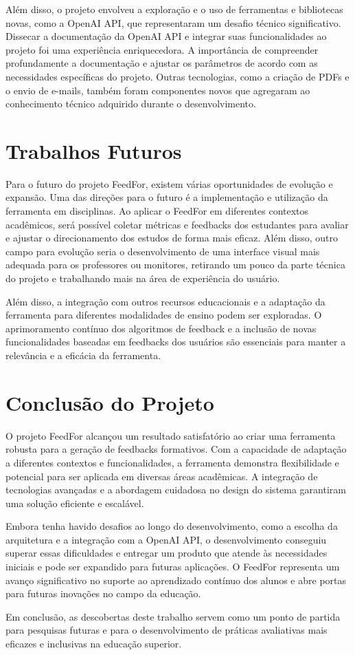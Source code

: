 Além disso, o projeto envolveu a exploração e o uso de ferramentas e bibliotecas novas, como a OpenAI API, que representaram um desafio técnico significativo. Dissecar a documentação da OpenAI API e integrar suas funcionalidades ao projeto foi uma experiência enriquecedora. A importância de compreender profundamente a documentação e ajustar os parâmetros de acordo com as necessidades específicas do projeto. Outras tecnologias, como a criação de PDFs e o envio de e-mails, também foram componentes novos que agregaram ao conhecimento técnico adquirido durante o desenvolvimento.

\section{Trabalhos Futuros}

Para o futuro do projeto FeedFor, existem várias oportunidades de evolução e expansão. Uma das direções para o futuro é a implementação e utilização da ferramenta em disciplinas. Ao aplicar o FeedFor em diferentes contextos acadêmicos, será possível coletar métricas e feedbacks dos estudantes para avaliar e ajustar o direcionamento dos estudos de forma mais eficaz. Além disso, outro campo para evolução seria o desenvolvimento de uma interface visual mais adequada para os professores ou monitores, retirando um pouco da parte técnica do projeto e trabalhando mais na área de experiência do usuário.

Além disso, a integração com outros recursos educacionais e a adaptação da ferramenta para diferentes modalidades de ensino podem ser exploradas. O aprimoramento contínuo dos algoritmos de feedback e a inclusão de novas funcionalidades baseadas em feedbacks dos usuários são essenciais para manter a relevância e a eficácia da ferramenta.

\section{Conclusão do Projeto}

O projeto FeedFor alcançou um resultado satisfatório ao criar uma ferramenta robusta para a geração de feedbacks formativos. Com a capacidade de adaptação a diferentes contextos e funcionalidades, a ferramenta demonstra flexibilidade e potencial para ser aplicada em diversas áreas acadêmicas. A integração de tecnologias avançadas e a abordagem cuidadosa no design do sistema garantiram uma solução eficiente e escalável.

Embora tenha havido desafios ao longo do desenvolvimento, como a escolha da arquitetura e a integração com a OpenAI API, o desenvolvimento conseguiu superar essas dificuldades e entregar um produto que atende às necessidades iniciais e pode ser expandido para futuras aplicações. O FeedFor representa um avanço significativo no suporte ao aprendizado contínuo dos alunos e abre portas para futuras inovações no campo da educação.

Em conclusão, as descobertas deste trabalho servem como um ponto de partida para pesquisas futuras e para o desenvolvimento de práticas avaliativas mais eficazes e inclusivas na educação superior.